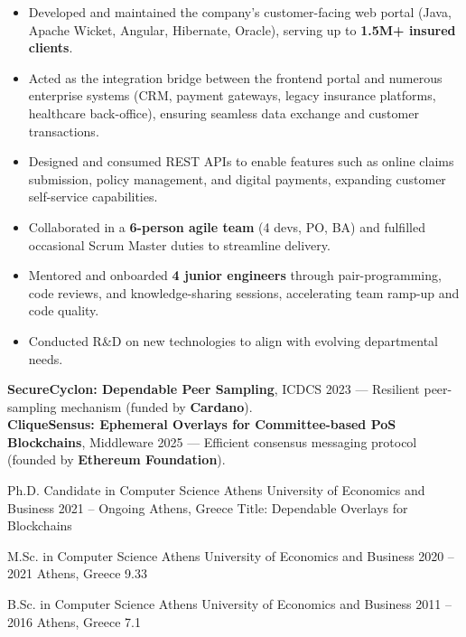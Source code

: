 \documentclass[10pt,a4paper,ragged2e,withhyper]{altacv}
\begin{document}
\begin{paracol}{2}
            \begin{itemize}
                \item Developed and maintained the company’s customer-facing web portal (Java, Apache Wicket, Angular, Hibernate, Oracle), serving up to \textbf{1.5M+ insured clients}.
                \item Acted as the integration bridge between the frontend portal and numerous enterprise systems (CRM, payment gateways, legacy insurance platforms, healthcare back-office), ensuring seamless data exchange and customer transactions.
                \item Designed and consumed REST APIs to enable features such as online claims submission, policy management, and digital payments, expanding customer self-service capabilities.
                \item Collaborated in a \textbf{6-person agile team} (4 devs, PO, BA) and fulfilled occasional Scrum Master duties to streamline delivery.
                \item Mentored and onboarded \textbf{4 junior engineers} through pair-programming, code reviews, and knowledge-sharing sessions, accelerating team ramp-up and code quality.
                \item Conducted R\&D on new technologies to align with evolving departmental needs.
            \end{itemize}


        \textbf{SecureCyclon: Dependable Peer Sampling}, ICDCS 2023 —
        Resilient peer-sampling mechanism (funded by \textbf{Cardano}). \\[0.5em]

        \textbf{CliqueSensus: Ephemeral Overlays for Committee-based PoS Blockchains}, Middleware 2025 —
        Efficient consensus messaging protocol (founded by \textbf{Ethereum Foundation}).


        \cveducation
          {Ph.D. Candidate in Computer Science}
          {Athens University of Economics and Business}
          {2021 -- Ongoing}
          {Athens, Greece}
          {}
          {Title: Dependable Overlays for Blockchains}

        \cveducation
          {M.Sc. in Computer Science}
          {Athens University of Economics and Business}
          {2020 -- 2021}
          {Athens, Greece}
          {9.33}
          {}

        \cveducation
          {B.Sc. in Computer Science}
          {Athens University of Economics and Business}
          {2011 -- 2016}
          {Athens, Greece}
          {7.1}
          {}

    \end{paracol}
\end{document}

